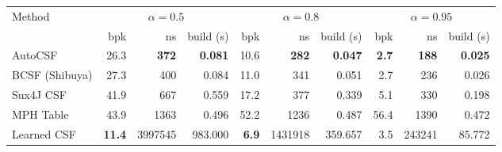 \begin{tabular}{lrrrrrrrrr}
\toprule
Method & \multicolumn{3}{c}{$\alpha\!=\!0.5$} & \multicolumn{3}{c}{$\alpha\!=\!0.8$} & \multicolumn{3}{c}{$\alpha\!=\!0.95$} \\
 & bpk & ns & build (s) & bpk & ns & build (s) & bpk & ns & build (s) \\
\midrule
AutoCSF & 26.3 & \textbf{372} & \textbf{0.081} & 10.6 & \textbf{282} & \textbf{0.047} & \textbf{2.7} & \textbf{188} & \textbf{0.025} \\
BCSF (Shibuya) & 27.3 & 400 & 0.084 & 11.0 & 341 & 0.051 & 2.7 & 236 & 0.026 \\
Sux4J CSF & 41.9 & 667 & 0.559 & 17.2 & 377 & 0.339 & 5.1 & 330 & 0.198 \\
MPH Table & 43.9 & 1363 & 0.496 & 52.2 & 1236 & 0.487 & 56.4 & 1390 & 0.472 \\
Learned CSF & \textbf{11.4} & 3997545 & 983.000 & \textbf{6.9} & 1431918 & 359.657 & 3.5 & 243241 & 85.772 \\
\bottomrule
\end{tabular}